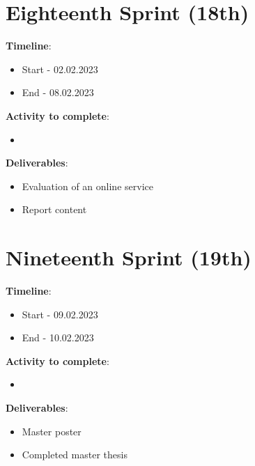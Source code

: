 \section{Eighteenth Sprint (18th)}
\label{sec:planning_eighteenth}

\textbf{Timeline}:
\begin{itemize}
    \item Start - 02.02.2023
	\item End - 08.02.2023
\end{itemize}

\textbf{Activity to complete}:
\begin{itemize}
    \item {}
\end{itemize}

\textbf{Deliverables}: 
\begin{itemize}
    \item Evaluation of an online service
    \item Report content
\end{itemize}

\section{Nineteenth Sprint (19th)}
\label{sec:planning_nineteenth}

\textbf{Timeline}:
\begin{itemize}
    \item Start - 09.02.2023
	\item End - 10.02.2023
\end{itemize}

\textbf{Activity to complete}:
\begin{itemize}
    \item {}
\end{itemize}

\textbf{Deliverables}: 
\begin{itemize}
    \item Master poster
    \item Completed master thesis
\end{itemize}

\newpage

